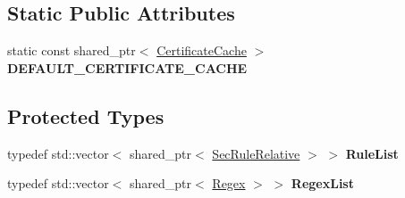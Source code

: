 \subsection*{Static Public Attributes}
\begin{DoxyCompactItemize}
\item 
static const shared\+\_\+ptr$<$ \hyperlink{classndn_1_1CertificateCache}{Certificate\+Cache} $>$ {\bfseries D\+E\+F\+A\+U\+L\+T\+\_\+\+C\+E\+R\+T\+I\+F\+I\+C\+A\+T\+E\+\_\+\+C\+A\+C\+HE}\hypertarget{classndn_1_1ValidatorRegex_a425a529fe429cdd39757185f5f233386}{}\label{classndn_1_1ValidatorRegex_a425a529fe429cdd39757185f5f233386}

\end{DoxyCompactItemize}
\subsection*{Protected Types}
\begin{DoxyCompactItemize}
\item 
typedef std\+::vector$<$ shared\+\_\+ptr$<$ \hyperlink{classndn_1_1SecRuleRelative}{Sec\+Rule\+Relative} $>$ $>$ {\bfseries Rule\+List}\hypertarget{classndn_1_1ValidatorRegex_abe7d10372bb79069e1a0c5bf7eb91b6c}{}\label{classndn_1_1ValidatorRegex_abe7d10372bb79069e1a0c5bf7eb91b6c}

\item 
typedef std\+::vector$<$ shared\+\_\+ptr$<$ \hyperlink{classndn_1_1RegexTopMatcher}{Regex} $>$ $>$ {\bfseries Regex\+List}\hypertarget{classndn_1_1ValidatorRegex_adaf97233730f4e270723f5db53051cc3}{}\label{classndn_1_1ValidatorRegex_adaf97233730f4e270723f5db53051cc3}

\end{DoxyCompactItemize}
